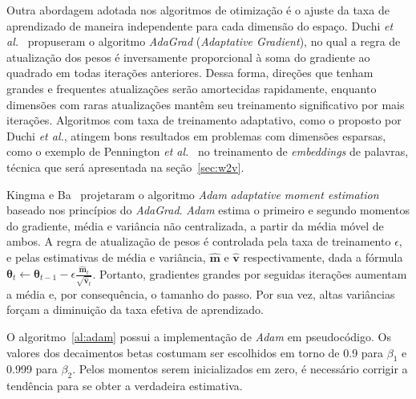 Outra abordagem adotada nos algoritmos de otimização é o ajuste da taxa de aprendizado de maneira independente para cada dimensão do espaço. Duchi \textit{et al.}~\cite{duchi11} propuseram o algoritmo \textit{AdaGrad} (\textit{Adaptative Gradient}), no qual a regra de atualização dos pesos é inversamente proporcional à soma do gradiente ao quadrado em todas iterações anteriores. Dessa forma, direções que tenham grandes e frequentes atualizações serão amortecidas rapidamente, enquanto dimensões com raras atualizações mantêm seu treinamento significativo por mais iterações. Algoritmos com taxa de treinamento adaptativo, como o proposto por Duchi \textit{et al.}, atingem bons resultados em problemas com dimensões esparsas, como o exemplo de Pennington \textit{et al.}~\cite{pennington14} no treinamento de \textit{embeddings} de palavras, técnica que será apresentada na seção~\ref{sec:w2v}.

Kingma e Ba~\cite{kingma14} projetaram o algoritmo \textit{Adam} \textit{adaptative moment estimation} baseado nos princípios do \textit{AdaGrad}. \textit{Adam} estima o primeiro e segundo momentos do gradiente, média e variância não centralizada, a partir da média móvel de ambos. A regra de atualização de pesos é controlada pela taxa de treinamento $\epsilon$, e pelas estimativas de média e variância, $\mathbf{\hat{m}}$ e $\mathbf{\hat{v}}$ respectivamente, dada a fórmula $\boldsymbol{\theta}_{t} \gets \boldsymbol{\theta}_{t-1} - \epsilon \frac{\mathbf{\hat{m}}_{t}}{\sqrt{\mathbf{\hat{v}}_{t}}} $. Portanto, gradientes grandes por seguidas iterações aumentam a média e, por consequência, o tamanho do passo. Por sua vez, altas variâncias forçam a diminuição da taxa efetiva de aprendizado.

O algoritmo~\ref{al:adam} possui a implementação de \textit{Adam} em pseudocódigo. Os valores dos decaimentos betas costumam ser escolhidos em torno de 0.9 para $\beta_{1}$ e 0.999 para $\beta_{2}$. Pelos momentos serem inicializados em zero, é necessário corrigir a tendência para se obter a verdadeira estimativa.

